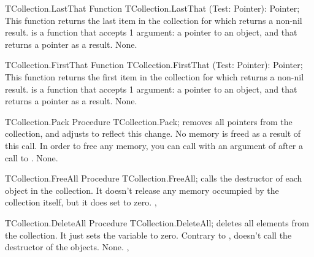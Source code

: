 \begin{function}{TCollection.LastThat}
\Declaration
Function TCollection.LastThat (Test: Pointer): Pointer;
\Description
This function returns the last item in the collection for which 
returns a non-nil result.  is a function that accepts 1 argument:
a pointer to an object, and that returns a pointer as a result.
\Errors
None.
\SeeAlso
{}
\end{function}



\begin{function}{TCollection.FirstThat}
\Declaration
Function TCollection.FirstThat (Test: Pointer): Pointer;
\Description
This function returns the first item in the collection for which 
returns a non-nil result.  is a function that accepts 1 argument:
a pointer to an object, and that returns a pointer as a result.
\Errors
None.
\SeeAlso
{}
\end{function}



\begin{procedure}{TCollection.Pack}
\Declaration
Procedure TCollection.Pack;
\Description
{} removes all  pointers from the collection, and adjusts
 to reflect this change. No memory is freed as a result of this
call. In order to free any memory, you can call  with an
argument of  after a call to .
\Errors
None.
\SeeAlso
{}
\end{procedure}



\begin{procedure}{TCollection.FreeAll}
\Declaration
Procedure TCollection.FreeAll;
\Description
{} calls the destructor of each object in the collection.
It doesn't release any memory occumpied by the collection itself, but it
does set  to zero.
\Errors
\SeeAlso
{}, 
\end{procedure}



\begin{procedure}{TCollection.DeleteAll}
\Declaration
Procedure TCollection.DeleteAll;
\Description
{} deletes all elements from the collection. It just sets 
the  variable to zero. Contrary to
,  doesn't call the
destructor of the objects.
\Errors
None.
\SeeAlso
{}, 
\end{procedure}

